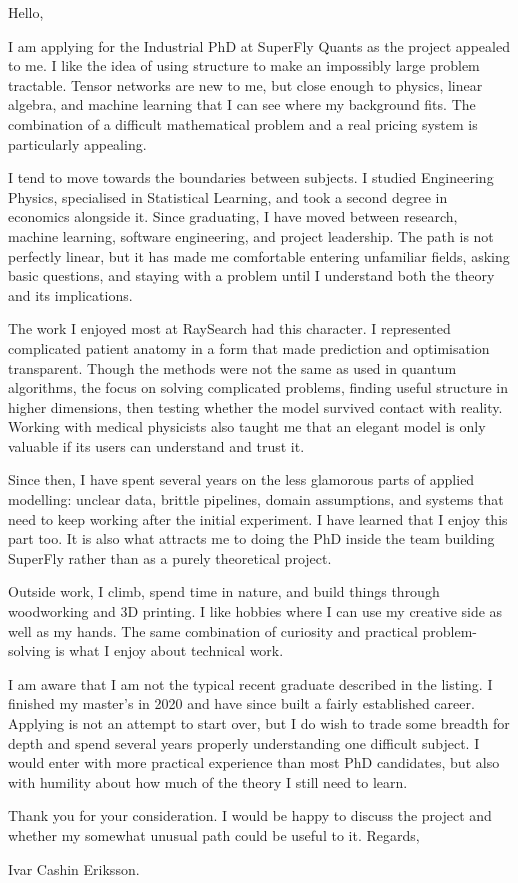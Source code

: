 \documentclass[11pt,a4paper]{moderncv}
\begin{document}
\makecvtitle
Hello,


\vspace*{2em}
I am applying for the Industrial PhD at SuperFly Quants as the project appealed to me. I like the idea of using structure to make an impossibly large problem tractable. Tensor networks are new to me, but close enough to physics, linear algebra, and machine learning that I can see where my background fits. The combination of a difficult mathematical problem and a real pricing system is particularly appealing.


\hspace*{2em}
I tend to move towards the boundaries between subjects. I studied Engineering Physics, specialised in Statistical Learning, and took a second degree in economics alongside it. Since graduating, I have moved between research, machine learning, software engineering, and project leadership. The path is not perfectly linear, but it has made me comfortable entering unfamiliar fields, asking basic questions, and staying with a problem until I understand both the theory and its implications.


\hspace*{2em}
The work I enjoyed most at RaySearch had this character. I represented complicated patient anatomy in a form that made prediction and optimisation transparent. Though the methods were not the same as used in quantum algorithms, the focus on solving complicated problems, finding useful structure in higher dimensions, then testing whether the model survived contact with reality. Working with medical physicists also taught me that an elegant model is only valuable if its users can understand and trust it.


\hspace*{2em}
Since then, I have spent several years on the less glamorous parts of applied modelling: unclear data, brittle pipelines, domain assumptions, and systems that need to keep working after the initial experiment. I have learned that I enjoy this part too. It is also what attracts me to doing the PhD inside the team building SuperFly rather than as a purely theoretical project.


\hspace*{2em}
Outside work, I climb, spend time in nature, and build things through woodworking and 3D printing. I like hobbies where I can use my creative side as well as my hands. The same combination of curiosity and practical problem-solving is what I enjoy about technical work.


\hspace*{2em}
I am aware that I am not the typical recent graduate described in the listing. I finished my master's in 2020 and have since built a fairly established career. Applying is not an attempt to start over, but I do wish to trade some breadth for depth and spend several years properly understanding one difficult subject. I would enter with more practical experience than most PhD candidates, but also with humility about how much of the theory I still need to learn.


\vspace*{2em}
Thank you for your consideration. I would be happy to discuss the project and whether my somewhat unusual path could be useful to it. Regards,


\vspace*{1em}
Ivar Cashin Eriksson.
\end{document}

